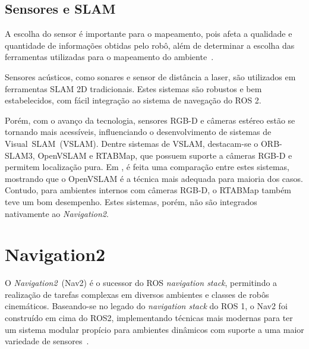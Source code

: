 \documentclass[repeatfields,xlists,xpacks,oneside,yearsonly]{ufrgscca}
\begin{document}
\subsection{Sensores e SLAM}

A escolha do sensor é importante para o mapeamento,
pois afeta a qualidade e quantidade de informações obtidas pelo robô, além
de determinar a escolha das ferramentas utilizadas para o mapeamento do
ambiente~\cite{SensorAndSLAM}.

Sensores acústicos, como sonares e sensor de distância a laser, são utilizados
em ferramentas SLAM 2D tradicionais. Estes sistemas são robustos e bem estabelecidos,
com fácil integração ao sistema de navegação do ROS 2.

Porém, com o avanço da tecnologia, sensores RGB-D e câmeras estéreo estão se tornando
mais acessíveis, influenciando o desenvolvimento de sistemas de Visual~SLAM~(VSLAM).
Dentre sistemas de VSLAM, destacam-se o ORB-SLAM3, OpenVSLAM e RTABMap, que possuem suporte
a câmeras RGB-D e permitem localização pura.
Em \textcite{VSLAM}, é feita uma comparação entre estes sistemas, mostrando que o
OpenVSLAM é a técnica mais adequada para maioria dos casos.
Contudo, para ambientes internos com câmeras RGB-D, o RTABMap também teve um bom desempenho.
Estes sistemas, porém, não são integrados nativamente ao \textit{Navigation2}.


\section{Navigation2}

O \textit{Navigation2}~(Nav2) é o sucessor do ROS \textit{navigation stack}, permitindo
a realização de tarefas complexas em diversos ambientes e classes de robôs cinemáticos.
Baseando-se no legado do \textit{navigation stack} do ROS 1, o Nav2 foi construído em cima
do ROS2, implementando técnicas mais modernas para ter um sistema modular propício para
ambientes dinâmicos com suporte a uma maior variedade de sensores~\cite{Nav2}.
\end{document}

